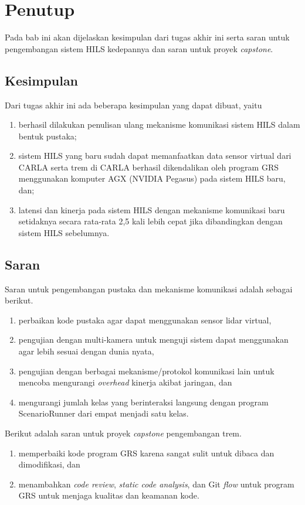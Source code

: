 \chapter{Penutup}\label{chapter-5}

Pada bab ini akan dijelaskan kesimpulan dari tugas akhir ini serta saran untuk
pengembangan sistem HILS kedepannya dan saran untuk proyek \textit{capstone}.

\section{Kesimpulan}

Dari tugas akhir ini ada beberapa kesimpulan yang dapat dibuat, yaitu
\begin{enumerate}
	\item berhasil dilakukan penulisan ulang mekanisme komunikasi sistem HILS
	      dalam bentuk pustaka;
	\item sistem HILS yang baru sudah dapat memanfaatkan data sensor virtual
	      dari CARLA serta trem di CARLA berhasil dikendalikan oleh program GRS
	      menggunakan komputer AGX (NVIDIA Pegasus) pada sistem HILS baru, dan;
	\item latensi dan kinerja pada sistem HILS dengan mekanisme komunikasi baru
	      setidaknya secara rata-rata 2,5 kali lebih cepat jika dibandingkan
	      dengan sistem HILS sebelumnya.
\end{enumerate}

\section{Saran}

Saran untuk pengembangan pustaka dan mekanisme komunikasi adalah sebagai
berikut.
\begin{enumerate}
	\item perbaikan kode pustaka agar dapat menggunakan sensor lidar virtual,
	\item pengujian dengan multi-kamera untuk menguji sistem dapat menggunakan
	      agar lebih sesuai dengan dunia nyata,
	\item pengujian dengan berbagai mekanisme/protokol komunikasi lain untuk
	      mencoba mengurangi \textit{overhead} kinerja akibat jaringan, dan
	\item mengurangi jumlah kelas yang berinteraksi langsung dengan program
	      ScenarioRunner dari empat menjadi satu kelas.
\end{enumerate}

Berikut adalah saran untuk proyek \textit{capstone} pengembangan trem.
\begin{enumerate}
	\item memperbaiki kode program GRS karena sangat sulit untuk dibaca dan
	      dimodifikasi, dan
	\item menambahkan \textit{code review}, \textit{static code analysis}, dan
	      Git \textit{flow} untuk program GRS untuk menjaga kualitas dan keamanan
	      kode.
\end{enumerate}
